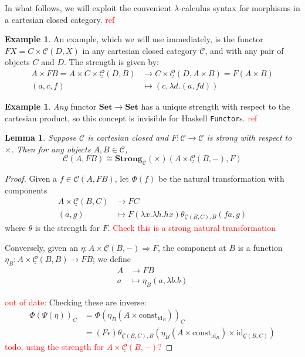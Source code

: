 \documentclass[11pt,a4paper]{article}
\theoremstyle{plain}
\newtheorem{lemma}[theorem]{Lemma}
\theoremstyle{definition}
\newtheorem{example}[theorem]{Example}
\newcommand{\C}{\mathscr{C}}
\newcommand{\homC}{\underline{\C}}
\newcommand{\Set}{\mathbf{Set}}
\newcommand{\Strong}{\mathbf{Strong}}
\newcommand{\id}{\mathrm{id}}
\newcommand{\const}{\mathrm{const}}
\newcommand{\todo}[1]{\textcolor{red}{\small #1}}
\begin{document}
In what follows, we will exploit the convenient $\lambda$-calculus syntax for morphisms in a cartesian closed category. \todo{ref}

\begin{example}
An example, which we will use immediately, is the functor $FX = C \times \homC(D, X)$ in any cartesian closed category $\C$, and with any pair of objects $C$ and $D$. The strength is given by:
\begin{align*}
A \times FB = A \times C \times \homC(D, B) &\to C \times \homC(D, A \times B) = F(A \times B)\\
(a, c, f) &\mapsto (c, \lambda d. (a, fd))
\end{align*}
\end{example}

\begin{example}
\emph{Any} functor $\Set \to \Set$ has a unique strength with respect to the cartesian product, so this concept is invisible for Haskell \texttt{Functor}s. \todo{ref}
\end{example}

\begin{lemma}
Suppose $\C$ is cartesian closed and $F : \C \to \C$ is strong with respect to $\times$. Then for any objects $A, B \in \C$, \[\C(A, FB) \cong \Strong_\C(\times)(A \times \homC(B, -), F)\]
\end{lemma}
\begin{proof}
Given a $f \in \C(A, FB)$, let $\Phi(f)$ be the natural transformation with components
\begin{align*}
A \times \homC(B, C) &\to FC \\
(a, g) &\mapsto F(\lambda x. \lambda h. h x)\theta_{\homC(B, C), B}(fa, g)
\end{align*}
where $\theta$ is the strength for $F$.
\todo{Check this is a strong natural transformation}

Conversely, given an $\eta : A \times \homC(B, -) \Rightarrow F$, the component at $B$ is a function $\eta_B : A \times \homC(B, B) \to FB$; we define
\begin{align*}
A &\to FB \\
a &\mapsto \eta_B(a, \lambda b. b)
\end{align*}

\todo{out of date:}
Checking these are inverse:
\begin{align*}
\Phi(\Psi(\eta))_C &= \Phi(\eta_B(A\times\const_{\id_B}))_C \\
&= (F\epsilon) \theta_{\homC(B, C), B} \left( \eta_B(A\times\const_{\id_B}) \times \id_{\homC(B, C)} \right)
\end{align*}
\todo{todo, using the strength for $A \times \homC(B, -)$?}
\end{proof}
\end{document}

